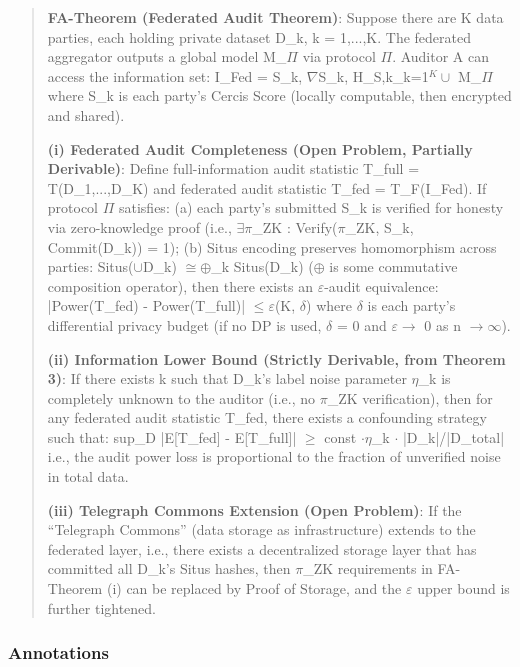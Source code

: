 \documentclass[
  12pt,
]{article}
\begin{document}
\begin{quote}
\textbf{FA-Theorem (Federated Audit Theorem)}: Suppose there are K data parties, each holding private dataset D\_k, k = 1,...,K. The federated aggregator outputs a global model M\_$\Pi$ via protocol $\Pi$. Auditor A can access the information set: I\_Fed = {S\_k, $\nabla$S\_k, H\_{S,k}}\_{k=1}$^K \cup$ {M\_$\Pi$} where S\_k is each party's Cercis Score (locally computable, then encrypted and shared).

\textbf{(i) Federated Audit Completeness (Open Problem, Partially Derivable)}: Define full-information audit statistic T\_full = T(D\_1,...,D\_K) and federated audit statistic T\_fed = T\_F(I\_Fed). If protocol $\Pi$ satisfies: (a) each party's submitted S\_k is verified for honesty via zero-knowledge proof (i.e., $\exists \pi$\_ZK : Verify($\pi$\_ZK, S\_k, Commit(D\_k)) = 1); (b) Situs encoding preserves homomorphism across parties: Situs($\cup$D\_k) $\cong \oplus$\_k Situs(D\_k) ($\oplus$ is some commutative composition operator), then there exists an $\varepsilon$-audit equivalence: |Power(T\_fed) - Power(T\_full)| $\leq \varepsilon$(K, $\delta$) where $\delta$ is each party's differential privacy budget (if no DP is used, $\delta$ = 0 and $\varepsilon \to$ 0 as n $\to \infty$).

\textbf{(ii) Information Lower Bound (Strictly Derivable, from Theorem 3)}: If there exists k such that D\_k's label noise parameter $\eta$\_k is completely unknown to the auditor (i.e., no $\pi$\_ZK verification), then for any federated audit statistic T\_fed, there exists a confounding strategy such that: sup\_{D} |E[T\_fed] - E[T\_full]| $\geq$ const $\cdot \eta$\_k $\cdot$ |D\_k|/|D\_total| i.e., the audit power loss is proportional to the fraction of unverified noise in total data.

\textbf{(iii) Telegraph Commons Extension (Open Problem)}: If the ``Telegraph Commons'' (data storage as infrastructure) extends to the federated layer, i.e., there exists a decentralized storage layer that has committed all D\_k's Situs hashes, then $\pi$\_ZK requirements in FA-Theorem (i) can be replaced by Proof of Storage, and the $\varepsilon$ upper bound is further tightened.
\end{quote}

\subsubsection{Annotations}\label{fa-annotations}
\end{document}
